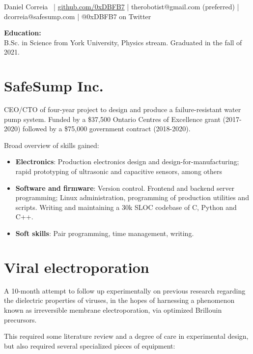 \documentclass[fleqn,10pt]{article}
\begin{document}
\small{{Daniel Correia}\  | \href{https://github.com/0xDBFB7}{github.com/0xDBFB7} | therobotist@gmail.com ({\footnotesize preferred}) | dcorreia@safesump.com | @0xDBFB7 on Twitter
\light{\makebox[\linewidth]{\rule{\textwidth}{0.4pt}}}


\begin{multicols}{1}

\begin{tcolorbox}
\textbf{Education:\\}
B.Sc. in Science from York University, Physics stream. Graduated in the fall of 2021.
\end{tcolorbox}
%
\section*{SafeSump Inc.}

CEO/CTO of four-year project to design and produce a failure-resistant water pump system. Funded by a \$37,500 Ontario Centres of Excellence grant (2017-2020) followed by a \$75,000 government contract (2018-2020).

Broad overview of skills gained:

\begin{itemize}
	\item \textbf{Electronics}: Production electronics design and design-for-manufacturing; rapid prototyping of ultrasonic and capacitive sensors, among others
	\item \textbf{Software and firmware}: Version control. Frontend and backend server programming; Linux administration, programming of production utilities and scripts. Writing and maintaining a 30k SLOC codebase of C, Python and C++.
	\item \textbf{Soft skills}: Pair programming, time management, writing.
\end{itemize}


\section*{Viral electroporation}

A 10-month attempt to follow up experimentally on previous research regarding the dielectric properties of viruses, in the hopes of harnessing a phenomenon known as irreversible membrane electroporation, via optimized Brillouin precursors.

This required some literature review and a degree of care in experimental design, but also required several specialized pieces of equipment:


\end{multicols}}
\end{document}
